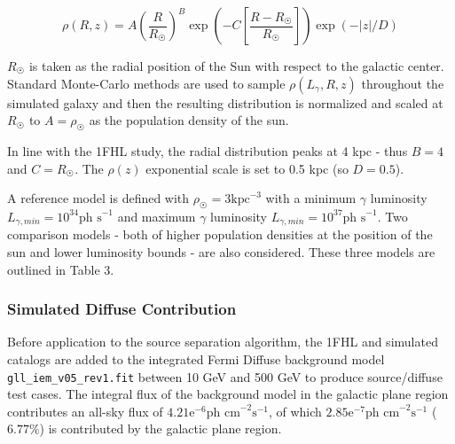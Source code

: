 \documentclass{PoS}
\begin{document}
\begin{equation}
\rho(R, z) = A\left(\frac{R}{R_{\astrosun}}\right)^{B} \exp\left(-C\left[\frac{R-R_{\astrosun}}{R_{\astrosun}}\right]\right)\exp(-|z|/D)
\end{equation}

$R_{\astrosun}$ is taken as the radial position of the Sun with respect to the galactic center. Standard Monte-Carlo methods are used to sample $\rho(L_{\gamma}, R, z)$ throughout the simulated galaxy and then the resulting distribution is normalized and scaled at $R_{\astrosun}$ to $A = \rho_{\astrosun}$ as the population density of the sun.

In line with the 1FHL study, the radial distribution peaks at 4 kpc - thus $B = 4$ and $C = R_{\astrosun}$. The $\rho(z)$ exponential scale is set to 0.5 kpc (so $D=0.5$).

A reference model is defined with $\rho_{\astrosun} = 3 \text{kpc}^{-3}$ with a minimum $\gamma$ luminosity $L_{\gamma, min} = 10^{34} \text{ph s}^{-1}$ and maximum $\gamma$ luminosity $L_{\gamma, min} = 10^{37} \text{ph s}^{-1}$. Two comparison models - both of higher population densities at the position of the sun and lower luminosity bounds - are also considered. These three models are outlined in Table 3.

\begin{table}
\centering
{}
\caption{Parameters for 10 - 500 GeV Galaxy Population Simulations.}
\end{table}

\subsubsection{Simulated Diffuse Contribution}

Before application to the source separation algorithm, the 1FHL and simulated catalogs are added to the integrated Fermi Diffuse background model \verb|gll_iem_v05_rev1.fit| between 10 GeV and 500 GeV to produce source/diffuse test cases. The integral flux of the background model in the galactic plane region contributes an all-sky flux of $4.21\text{e}^{-6} \text{ph cm}^{-2}\text{s}^{-1}$, of which $2.85\text{e}^{-7} \text{ph cm}^{-2}\text{s}^{-1}$ ($6.77\%$) is contributed by the galactic plane region.
\end{document}

